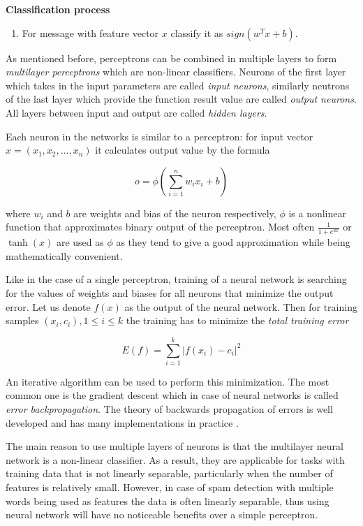 \documentclass[12pt]{report}
\begin{document}
\textbf{Classification process}

\begin{enumerate}
	\item For message with feature vector $x$ classify it as $sign(w^Tx + b)$.
\end{enumerate}

As mentioned before, perceptrons can be combined in multiple layers to form \textit{multilayer perceptrons} which are non-linear classifiers. Neurons of the first layer which takes in the input parameters are called \textit{input neurons}, similarly neutrons of the last layer which provide the function result value are called \textit{output neurons}. All layers between input and output are called \textit{hidden layers}.

Each neuron in the networks is similar to a perceptron: for input vector $x = (x_1, x_2, \dots, x_n)$ it calculates output value by the formula

$$o = \phi(\sum_{i = 1}^{n}w_i x_i + b)$$

where $w_i$ and $b$ are weights and bias of the neuron respectively, $\phi$ is a nonlinear function that approximates binary output of the perceptron. Most often $\frac{1}{1 + e^{ax}}$ or $\tanh(x)$ are used as $\phi$ as they tend to give a good approximation while being mathematically convenient.

Like in the case of a single perceptron, training of a neural network is searching for the values of weights and biases for all neurons that minimize the output error. Let us denote $f(x)$ as the output of the neural network. Then for training samples $(x_i, c_i), 1 \leq i \leq k$ the training has to minimize the \textit{total training error}

$$E(f) = \sum_{i = 1}^{k}|f(x_i) - c_i|^2$$

An iterative algorithm can be used to perform this minimization. The most common one is the gradient descent which in case of neural networks is called \textit{error backpropagation}. The theory of backwards propagation of errors is well developed and has many implementations in practice \cite{Haykin}.

The main reason to use multiple layers of neurons is that the multilayer neural network is a non-linear classifier. As a result, they are applicable for tasks with training data that is not linearly separable, particularly when the number of features is relatively small. However, in case of spam detection with multiple words being used as features the data is often linearly separable, thus using neural network will have no noticeable benefits over a simple perceptron.
\end{document}

